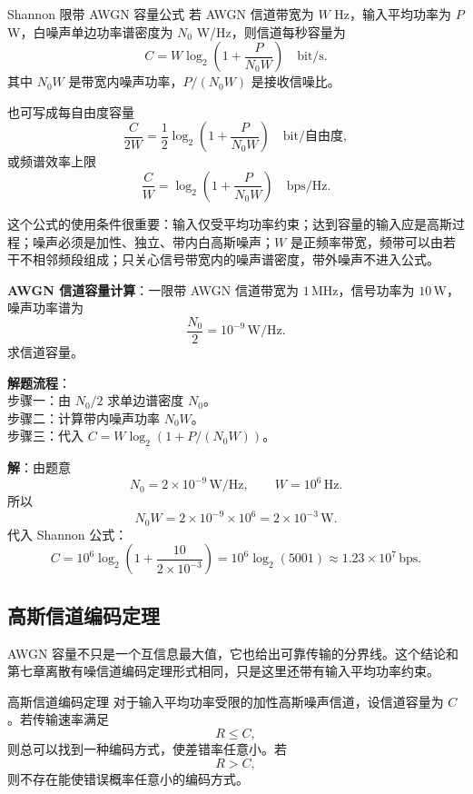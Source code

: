 \begin{formulaBox}{Shannon 限带 AWGN 容量公式}
若 AWGN 信道带宽为 $W$ Hz，输入平均功率为 $P$ W，白噪声单边功率谱密度为 $N_0$ W/Hz，则信道每秒容量为
\[
C=W\log_2\left(1+\frac{P}{N_0W}\right)
\quad\text{bit/s}.
\]
其中 $N_0W$ 是带宽内噪声功率，$P/(N_0W)$ 是接收信噪比。
\end{formulaBox}

也可写成每自由度容量
\[
\frac{C}{2W}=\frac12\log_2\left(1+\frac{P}{N_0W}\right)
\quad\text{bit/自由度},
\]
或频谱效率上限
\[
\frac{C}{W}=\log_2\left(1+\frac{P}{N_0W}\right)
\quad\text{bps/Hz}.
\]

这个公式的使用条件很重要：输入仅受平均功率约束；达到容量的输入应是高斯过程；噪声必须是加性、独立、带内白高斯噪声；$W$ 是正频率带宽，频带可以由若干不相邻频段组成；只关心信号带宽内的噪声谱密度，带外噪声不进入公式。

\begin{example}
\label{ex:ch8-awgn-capacity}
\textbf{AWGN 信道容量计算}：一限带 AWGN 信道带宽为 $1\,\mathrm{MHz}$，信号功率为 $10\,\mathrm{W}$，噪声功率谱为
\[
\frac{N_0}{2}=10^{-9}\,\mathrm{W/Hz}.
\]
求信道容量。

\noindent \textbf{解题流程}：\\[2pt]
步骤一：由 $N_0/2$ 求单边谱密度 $N_0$。\\
步骤二：计算带内噪声功率 $N_0W$。\\
步骤三：代入 $C=W\log_2(1+P/(N_0W))$。

\textbf{解}：由题意
\[
N_0=2\times10^{-9}\,\mathrm{W/Hz},
\qquad
W=10^6\,\mathrm{Hz}.
\]
所以
\[
N_0W=2\times10^{-9}\times10^6=2\times10^{-3}\,\mathrm{W}.
\]
代入 Shannon 公式：
\[
C=10^6\log_2\left(1+\frac{10}{2\times10^{-3}}\right)
=10^6\log_2(5001)
\approx1.23\times10^7\,\mathrm{bps}.
\]
\end{example}

\subsection{高斯信道编码定理}

AWGN 容量不只是一个互信息最大值，它也给出可靠传输的分界线。这个结论和第七章离散有噪信道编码定理形式相同，只是这里还带有输入平均功率约束。

\begin{theoremBox}{高斯信道编码定理}
对于输入平均功率受限的加性高斯噪声信道，设信道容量为 $C$。若传输速率满足
\[
R\le C,
\]
则总可以找到一种编码方式，使差错率任意小。若
\[
R>C,
\]
则不存在能使错误概率任意小的编码方式。
\end{theoremBox}

